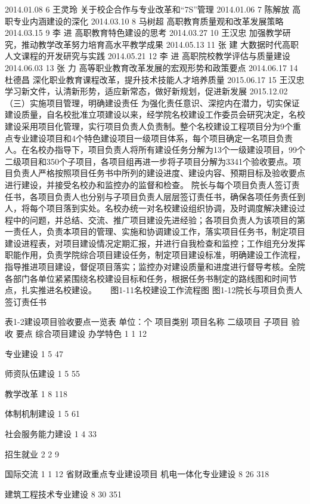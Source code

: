 2014.01.08
6
王灵玲
关于校企合作与专业改革和“7S”管理
2014.01.06
7
陈解放
高职专业内涵建设的深化
2014.03.10
8
马树超
高职教育质量观和改革发展策略
2014.03.15
9
李  进
高职教育特色建设的思考
2014.03.27
10
王汉忠
加强教学研究，推动教学改革努力培育高水平教学成果
2014.05.13
11
张  建
大数据时代高职人文课程的开发研究与实践
2014.05.21
12
李  进
高职院校教学评估与质量建设
2014.06.03
13
张  力
高等职业教育改革发展的宏观形势和政策要点
2014.06.17
14
杜德昌
深化职业教育课程改革，提升技术技能人才培养质量
2015.06.17
15
王汉忠
学习新文件，认清新形势，适应新常态，做好新规划，促进新发展
2015.12.02
（三）实施项目管理，明确建设责任
为强化责任意识、深挖内在潜力，切实保证建设质量，自名校批准立项建设以来，经学院名校建设工作委员会研究决定，名校建设采用项目化管理，实行项目负责人负责制。整个名校建设工程项目分为9个重点专业建设项目和4个特色建设项目一级项目体系，每个项目确定一名项目负责人。在名校办指导下，项目负责人将所有建设任务分解为13个一级建设项目，99个二级项目和350个子项目，各项目组再进一步将子项目分解为3341个验收要点。项目负责人严格按照项目任务书中所列的建设进度、建设内容、预期目标及验收要点进行建设，并接受名校办和监控办的监督和检查。
院长与每个项目负责人签订责任书，各项目负责人也分别与子项目负责人层层签订责任书，确保各项任务责任到人，将每个项目落到实处。名校办统一对名校建设组织协调，及时调度解决建设过程中的问题，并总结、交流、推广项目建设先进经验；各项目负责人为该项目的第一责任人，负责本项目的管理、实施和协调建设工作，落实项目任务书，制定项目建设进程表，对项目建设情况定期汇报，并进行自我检查和监控；工作组充分发挥职能作用，负责学院综合项目建设任务，制定项目建设标准，明确建设工作流程，指导推进项目建设，督促项目落实；监控办对建设质量和进度进行督导考核。全院各部门各单位紧紧围绕名校建设目标和任务，根据任务书制定的路线图和时间节点，扎实推进名校建设。
 　     
图1-11名校建设工作流程图         图1-12院长与项目负责人签订责任书





表1-2建设项目验收要点一览表      单位：个
项目类别
项目名称
二级项目
子项目
验收
要点
综合项目建设
办学特色
1
1
12

专业建设
1
5
47

师资队伍建设
1
5
55

教学改革
1
8
118

体制机制建设
1
5
61

社会服务能力建设
1
4
33

招生就业
2
2
9

国际交流
1
1
12
省财政重点专业建设项目
机电一体化专业建设
8
26
318

建筑工程技术专业建设
8
30
351

